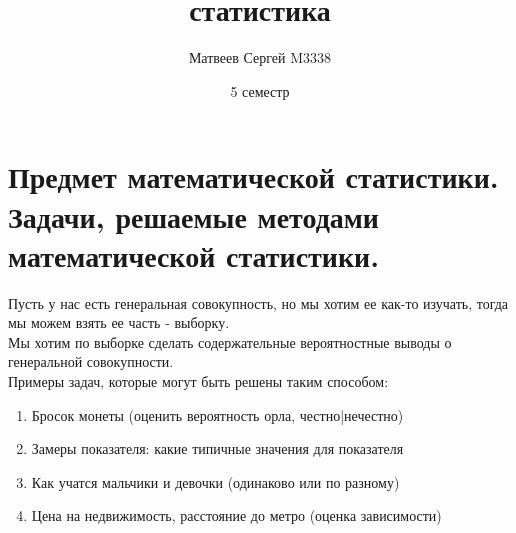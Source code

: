 \documentclass{article}
\title{\hugeМатематическая статистика}
\author{Матвеев Сергей M3338}
\date{5 семестр}
\newcommand\0{\mathbb{0}}
\newcommand\1{\mathbb{1}}
\begin{document}
\maketitle

\section{Предмет математической статистики. Задачи, решаемые методами математической статистики.}
Пусть у нас есть генеральная совокупность, но мы хотим ее как-то изучать, тогда мы можем взять ее часть - выборку.\\
Мы хотим по выборке сделать содержательные вероятностные выводы о генеральной совокупности.\\
Примеры задач, которые могут быть решены таким способом:\\
\begin{enumerate}
    \item Бросок монеты (оценить вероятность орла, честно|нечестно)
    \item Замеры показателя: какие типичные значения для показателя
    \item Как учатся мальчики и девочки (одинаково или по разному)
    \item Цена на недвижимость, расстояние до метро (оценка зависимости)
\end{enumerate}
\end{document}
